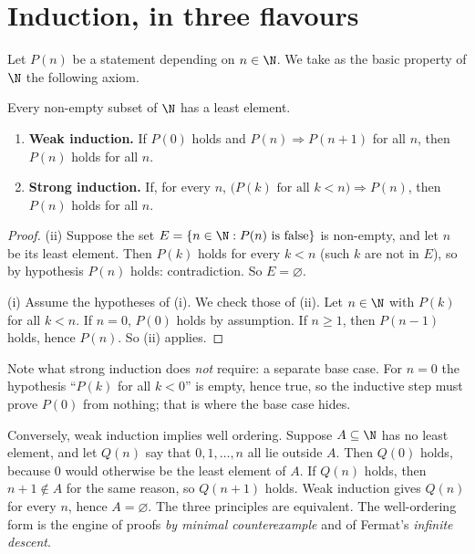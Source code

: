 \section{Induction, in three flavours}

Let $P(n)$ be a statement depending on $n\in\N$. We take as the basic property of $\N$ the following axiom.

\begin{reminder}
Every non-empty subset of $\N$ has a least element.
\end{reminder}

\begin{proposition}\label{prop:induction}
\begin{enumerate}[label=(\roman*)]
\item \textbf{Weak induction.} If $P(0)$ holds and $P(n)\Rightarrow P(n+1)$ for all $n$, then $P(n)$ holds for all $n$.
\item \textbf{Strong induction.} If, for every $n$, $\bigl(P(k)\text{ for all }k<n\bigr)\Rightarrow P(n)$, then $P(n)$ holds for all $n$.
\end{enumerate}
\end{proposition}
\begin{proof}
(ii) Suppose the set $E=\{n\in\N:P(n)\text{ is false}\}$ is non-empty, and let $n$ be its least element. Then $P(k)$ holds for every $k<n$ (such $k$ are not in $E$), so by hypothesis $P(n)$ holds: contradiction. So $E=\varnothing$.

(i) Assume the hypotheses of (i). We check those of (ii). Let $n\in\N$ with $P(k)$ for all $k<n$. If $n=0$, $P(0)$ holds by assumption. If $n\ge1$, then $P(n-1)$ holds, hence $P(n)$. So (ii) applies.
\end{proof}

Note what strong induction does \emph{not} require: a separate base case. For $n=0$ the hypothesis ``$P(k)$ for all $k<0$'' is empty, hence true, so
the inductive step must prove $P(0)$ from nothing; that is where the base case hides.

Conversely, weak induction implies well ordering. Suppose $A\subseteq\N$ has no least element, and let $Q(n)$ say that $0,1,\dots,n$ all lie outside $A$. Then $Q(0)$ holds, because $0$ would otherwise be the least element of $A$. If $Q(n)$ holds, then $n+1\notin A$ for the same reason, so $Q(n+1)$ holds. Weak induction gives $Q(n)$ for every $n$, hence $A=\varnothing$. The three principles are equivalent. The well-ordering form is the engine of proofs \emph{by minimal counterexample} and of Fermat's \emph{infinite descent}.


